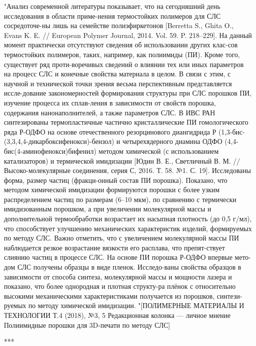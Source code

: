 \documentclass[oneside,final,14pt]{extreport}
\begin{document}
	
	"Анализ современной литературы показывает, что на сегодняшний день исследования в области приме-нения термостойких полимеров для СЛС сосредоточе-ны лишь на семействе полиэфиркетонов [Berretta S., Ghita O., Evans K. E. // European Polymer Journal, 2014. Vol. 59. P. 218–229]. На данный момент практически отсутствуют сведения об использовании других клас-сов термостойких полимеров, таких, например, как полиимиды (ПИ). Кроме того, существует ряд проти-воречивых сведений о влиянии тех или иных параметров на процесс СЛС и конечные свойства материала в целом. В связи с этим, с научной и технической точки зрения весьма перспективным представляется иссле-дование закономерностей формирования структуры при СЛС порошков ПИ, изучение процесса их сплав-ления в зависимости от свойств порошка, содержания нанонаполнителей, а также параметров СЛС.
	В ИВС РАН синтезированы термопластичные частично кристаллические ПИ гомологического ряда Р-ОДФО на основе отечественного резорцинового диангидрида Р (1,3-бис-(3,3,4,4-дикарбоксифенокси)-бензол) и четырехядерного диамина ОДФО (4,4-бис(4-аминофенокси)бифенил) методом химической (с использованием катализаторов) и термической имидизации [Юдин В. Е., Светличный В. М. // Высоко-молекулярные соединения, серия С, 2016. Т. 58. №1. С. 19]. Исследованы форма, размер частиц (фракци-онный состав ПИ порошка). Показано, что методом химической имидизации формируются порошки с более узким распределением частиц по размерам (6–10 мкм), по сравнению с термически имидизованным порошком, а при увеличении молекулярной массы и дополнительной термообработки возрастает их насыпная плотность (до 0,5 г/мл), что способствует улучшению механических характеристик изделий, формируемых по методу СЛС. Важно отметить, что с увеличением молекулярной массы ПИ наблюдается резкое возрастание вязкости его расплава, что препят-ствует слиянию частиц в процессе СЛС.
На основе ПИ порошка Р-ОДФО впервые мето-дом СЛС получены образцы в виде пленок. Исследо-ваны свойства образцов в зависимости от способа синтеза, молекулярной массы и мощности лазера и показано, что более однородная и плотная структу-ра плёнок с относительно высокими механическими характеристиками получается из порошков, синтези-руемых по методу химической имидизации.
	"[ПОЛИМЕРНЫЕ МАТЕРИАЛЫ И ТЕХНОЛОГИИ Т.4 (2018), №3, 5
Редакционная колонка — личное мнение
Полиимидные порошки для 3D-печати по методу СЛС]
	
	
	***
	
\end{document}
